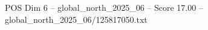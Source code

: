 \begin{textsample}{POS Dim 6 – global\_north\_2025\_06 – Score 17.00 – global\_north\_2025\_06/125817050.txt}
\end{textsample}
